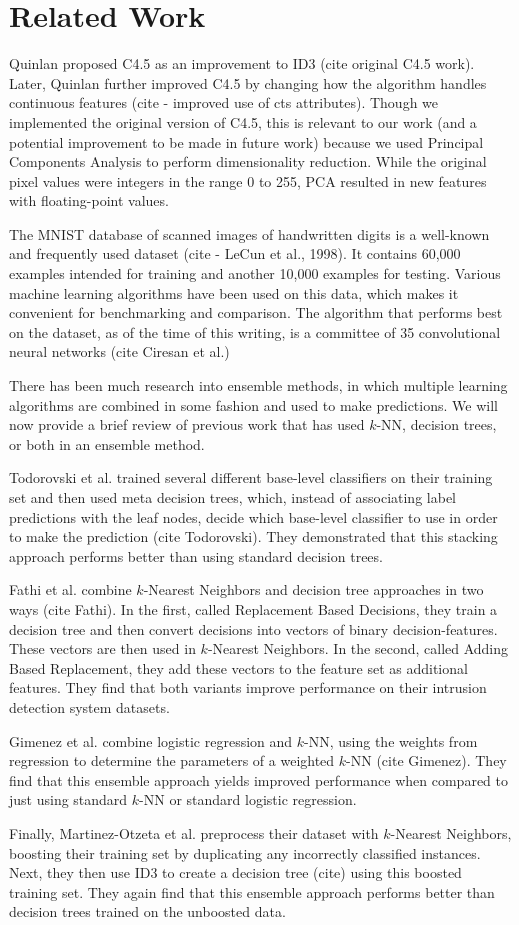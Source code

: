 \section{Related Work}
Quinlan proposed C4.5 as an improvement to ID3 (cite original C4.5 work). Later, Quinlan further improved C4.5 by changing how the algorithm handles continuous features (cite - improved use of cts attributes). Though we implemented the original version of C4.5, this is relevant to our work (and a potential improvement to be made in future work) because we used Principal Components Analysis to perform dimensionality reduction.  While the original pixel values were integers in the range 0 to 255, PCA resulted in new features with floating-point values.

The MNIST database of scanned images of handwritten digits is a well-known and frequently used dataset (cite - LeCun et al., 1998). It contains 60,000 examples intended for training and another 10,000 examples for testing. Various machine learning algorithms have been used on this data, which makes it convenient for benchmarking and comparison. The algorithm that performs best on the dataset, as of the time of this writing, is a committee of 35 convolutional neural networks (cite Ciresan et al.)

There has been much research into ensemble methods, in which multiple learning algorithms are combined in some fashion and used to make predictions. We will now provide a brief review of previous work that has used $k$-NN, decision trees, or both in an ensemble method.

 Todorovski et al. trained several different base-level classifiers on their training set and then used meta decision trees, which, instead of associating label predictions with the leaf nodes, decide which base-level classifier to use in order to make the prediction (cite Todorovski). They demonstrated that this stacking approach performs better than using standard decision trees.

Fathi et al. combine $k$-Nearest Neighbors and decision tree approaches in two ways (cite Fathi). In the first, called Replacement Based Decisions, they train a decision tree and then convert decisions into vectors of binary decision-features. These vectors are then used in $k$-Nearest Neighbors. In the second, called Adding Based Replacement, they add these vectors to the feature set as additional features. They find that both variants improve performance on their intrusion detection system datasets.

Gimenez et al. combine logistic regression and $k$-NN, using the weights from regression to determine the parameters of a weighted $k$-NN (cite Gimenez). They find that this ensemble approach yields improved performance when compared to just using standard $k$-NN or standard logistic regression. 

Finally, Martinez-Otzeta et al. preprocess their dataset with $k$-Nearest Neighbors, boosting their training set by duplicating  any incorrectly classified instances.  Next, they then use ID3 to create a decision tree (cite) using this boosted training set. They again find that this ensemble approach performs better than decision trees trained on the unboosted data. 

